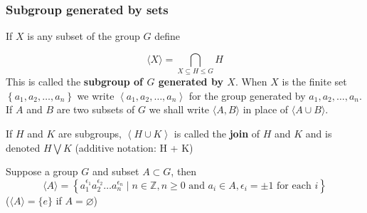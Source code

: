 \subsubsection{Subgroup generated by sets}%
\begin{definition}
    If $X$ is any subset of the group $G$ define

    \begin{equation*}
        \langle X\rangle=\bigcap_{X \subseteq H \leq G} H
    \end{equation*}
    This is called the \textbf{subgroup of $G$ generated by $X$}.
    When $X$ is the finite set $\left\{a_1, a_2, \ldots, a_n\right\}$ we write $\left\langle a_1, a_2, \ldots, a_n\right\rangle$ for the group generated by $a_1, a_2, \ldots, a_n$.
    If $A$ and $B$ are two subsets of $G$ we shall write $\langle A, B\rangle$ in place of $\langle A \cup B\rangle$.

    If $H$ and $K$ are subgroups, $\left\langle H\cup K \right\rangle$ is called the \textbf{join} of $H$ and $K$ and is denoted $H \bigvee  K$ (additive notation: H + K)
\end{definition}

\begin{theorem}
    Suppose a group $G$ and subset $A\subset G$, then
    \begin{equation*}
        \langle A\rangle
        =
        \left\{a_1^{\epsilon_1} a_2^{\epsilon_2} \ldots a_n^{\epsilon_n} \mid n \in \mathbb{Z}, n \geq 0 \text { and } a_i \in A, \epsilon_i= \pm 1 \text { for each } i\right\}
    \end{equation*}
    ($\langle A\rangle=\{e\}$ if $A=\varnothing $)
\end{theorem}
